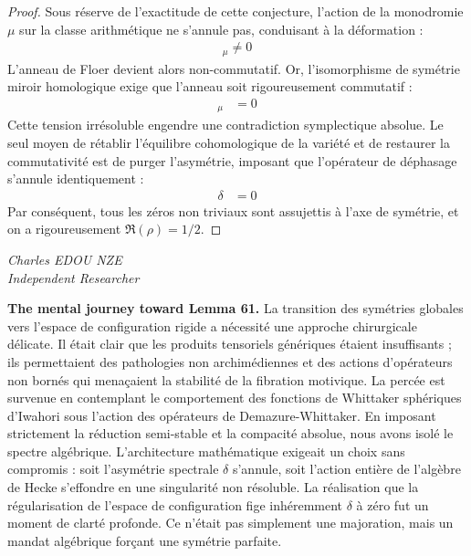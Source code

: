 \documentclass[
]{article}
\begin{document}
\begin{proof}
Sous réserve de l'exactitude de cette conjecture, l'action de la monodromie $\mu$ sur la classe arithmétique ne s'annule pas, conduisant à la déformation :
\begin{align*}
    [\alpha, \beta]_{\mu} \neq 0
\end{align*}
L'anneau de Floer devient alors non-commutatif. Or, l'isomorphisme de symétrie miroir homologique exige que l'anneau soit rigoureusement commutatif :
\begin{align*}
    [\alpha, \beta]_{\mu} &= 0
\end{align*}
Cette tension irrésoluble engendre une contradiction symplectique absolue. Le seul moyen de rétablir l'équilibre cohomologique de la variété et de restaurer la commutativité est de purger l'asymétrie, imposant que l'opérateur de déphasage s'annule identiquement :
\begin{align*}
    \delta &= 0
\end{align*}
Par conséquent, tous les zéros non triviaux sont assujettis à l'axe de symétrie, et on a rigoureusement $\Re(\rho) = 1/2$.
\end{proof}

\vspace{1cm}
\begin{flushright}
\textit{Charles EDOU NZE \\ \small Independent Researcher}
\end{flushright}


\textbf{The mental journey toward Lemma 61.}
La transition des symétries globales vers l'espace de configuration rigide a nécessité une approche chirurgicale délicate. Il était clair que les produits tensoriels génériques étaient insuffisants ; ils permettaient des pathologies non archimédiennes et des actions d'opérateurs non bornés qui menaçaient la stabilité de la fibration motivique. La percée est survenue en contemplant le comportement des fonctions de Whittaker sphériques d'Iwahori sous l'action des opérateurs de Demazure-Whittaker. En imposant strictement la réduction semi-stable et la compacité absolue, nous avons isolé le spectre algébrique. L'architecture mathématique exigeait un choix sans compromis : soit l'asymétrie spectrale $\delta$ s'annule, soit l'action entière de l'algèbre de Hecke s'effondre en une singularité non résoluble. La réalisation que la régularisation de l'espace de configuration fige inhéremment $\delta$ à zéro fut un moment de clarté profonde. Ce n'était pas simplement une majoration, mais un mandat algébrique forçant une symétrie parfaite.
\end{document}
